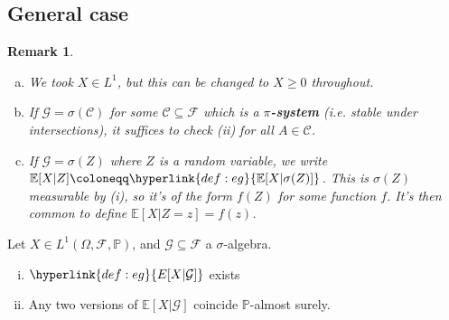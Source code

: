\documentclass{article}
\newtheorem{nremark}[nthm]{Remark}
\newcommand{\named}[1]{\textbf{#1}\index{#1}}
\newcommand{\F}{\mathcal{F}}
\newcommand{\G}{\mathcal{G}}
\newcommand{\1}[1]{\mathbbm{1}_{#1}}
\newcommand{\Prob}{\mathbb{P}}
\newcommand{\E}{\mathbb{E}}
\begin{document}
\subsection{General case}
\begin{nremark}\leavevmode
  \begin{enumerate}[(a)]
    \item We took $X \in L^1$, but this can be changed to $X \geq 0$ throughout.
    \item If $\G = \sigma(\mathcal{C})$ for some $\mathcal{C} \subseteq \F$ which is a \hypertarget{def:pisystem}{\textbf{$\pi$-system}} (i.e. stable under intersections), it suffices to check (ii) for all $A \in \mathcal{C}$.
    \item If $\G = \sigma(Z)$ where $Z$ is a random variable, we write $\E[X | Z] \coloneqq \hyperlink{def:eg}{\E[X | \sigma(Z)]}$. This is $\sigma(Z)$ measurable by (i), so it's of the form $f(Z)$ for some function $f$.
      It's then common to define $\E[X | Z=z] = f(z)$.
  \end{enumerate}
\end{nremark}
\begin{nthm}\label{thm:1.4}
  Let $X \in L^1(\Omega, \F, \Prob)$, and $\G \subseteq \F$ a $\sigma$-algebra.
  \begin{enumerate}[(i)]
    \item $\hyperlink{def:eg}{E[X | \G]}$ exists
    \item Any two versions of $\E[X | \G]$ coincide $\Prob$-almost surely.
  \end{enumerate}
\end{nthm}
\end{document}
